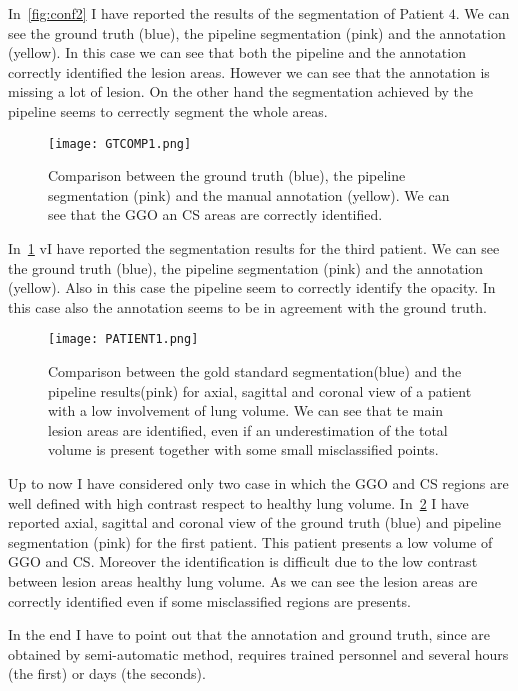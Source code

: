 \documentclass{standalone}
\begin{document}
 	In \figurename\,\ref{fig:conf2} I have reported the results of the segmentation of Patient $4$. We can see the ground truth (blue), the pipeline segmentation (pink) and the annotation (yellow). In this case we can see that both the pipeline and the annotation correctly identified the lesion areas. However we can see that the annotation is missing a lot of lesion. On the other hand the segmentation achieved by the pipeline seems to cerrectly segment the whole areas. 
 	
 	\begin{figure}[h!]
 		\texttt{[image: GTCOMP1.png]}
 		
 		\caption{Comparison between the ground truth (blue), the pipeline segmentation (pink) and the manual annotation (yellow). We can see that the GGO an CS areas are correctly identified.}\label{fig:conf1}
 	\end{figure}
 
 	In \figurename\,\ref{fig:conf1} vI have reported the segmentation results for the third patient. We can see the ground truth (blue), the pipeline segmentation (pink) and the annotation (yellow). Also in this case the pipeline seem to correctly identify the opacity. In this case also the annotation seems to be in agreement with the ground truth.
 	
 	\begin{figure}[h!]
 		\centering
 		\texttt{[image: PATIENT1.png]}  
 		\caption{Comparison between the gold standard segmentation(blue) and the pipeline results(pink) for axial, sagittal and coronal view of a patient with a low involvement of lung volume. We can see that te main lesion areas are identified, even if an underestimation of the total volume is present together with some small misclassified points.}\label{fig:pat1}
 	\end{figure}
 	
 	Up to now I have considered only two case in which the GGO and CS regions are well defined with high contrast respect to healthy lung volume. In \figurename\,\ref{fig:pat1} I have reported axial, sagittal and coronal view of the ground truth (blue) and pipeline segmentation (pink) for the first patient. This patient presents a low volume of GGO and CS. Moreover the identification is difficult due to the low contrast between lesion areas healthy lung volume. As we can see the lesion areas are correctly identified even if some misclassified regions are presents. 
 	
 	In the end I have to point out that the annotation and ground truth, since are obtained by semi-automatic method, requires  trained personnel and several hours (the first) or days (the seconds).  
 	
	
\end{document}
